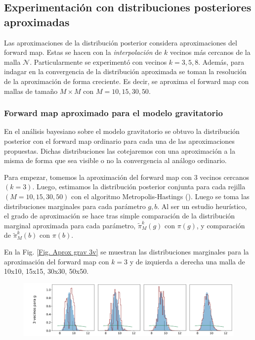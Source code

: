 
\subsection*{Experimentación con distribuciones posteriores aproximadas}

Las aproximaciones de la distribución posterior considera aproximaciones del forward map. Estas se hacen con la \textit{interpolación} de $k$ vecinos más cercanos de la malla $\mathcal{N}$. Particularmente se experimentó con vecinos $k = 3,5,8$. Además, para indagar en la convergencia de la distribución aproximada se toman la resolución de la aproximación de forma creciente. Es decir, se aproxima el forward map con mallas de tamaño $M \times M$ con $M = 10, 15, 30, 50$.

\subsubsection*{Forward map aproximado para el modelo gravitatorio}

En el análisis bayesiano sobre el modelo gravitatorio se obtuvo la distribución posterior con el forward map ordinario para cada una de las aproximaciones propuestas. Dichas distribuciones las cotejaremos con una aproximación a la misma de forma que sea visible o no la convergencia al análogo ordinario.

Para empezar, tomemos la aproximación del forward map con 3 vecinos cercanos $(k= 3)$. Luego, estimamos la distribución posterior conjunta para cada rejilla $(M = 10, 15, 30, 50)$ con el algoritmo Metropolis-Hastings (\cite{christen2010general}). Luego se toma las distribuciones marginales para cada parámetro $g,b$. Al ser un estudio heurístico, el grado de aproximación se hace tras simple comparación de la distribución marginal aproximada  para cada parámetro, $\tilde{\pi}^{k}_M(g)$ con $\pi(g)$, y comparación de $\tilde{\pi}^{k}_M(b)$ con $\pi(b)$.

En la Fig. \ref{Fig. Aprox grav 3v} se muestran las distribuciones marginales para la aproximación del forward map con $k = 3$ y de izquierda a derecha una malla de 10x10, 15x15, 30x30, 50x50.

\begin{figure}[H] 
    \centering 
    \includegraphics[width = 16 cm ]{img/Exp_Central_gravedad_Sigma/Figuras/Generales/Convergencia_theta1_1_gravedad_sigma.png} 
\end{figure} 

